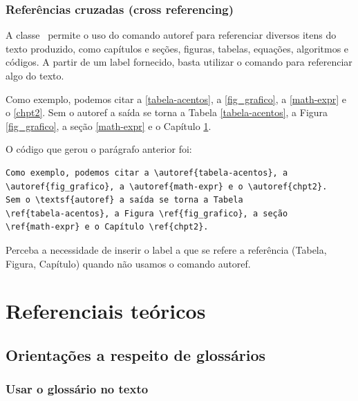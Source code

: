 \section{Referências cruzadas (cross referencing)}

A classe \abnTeX\ permite o uso do comando \textsf{autoref} para referenciar 
diversos itens do texto produzido, como capítulos e seções, figuras, tabelas, 
equações, algoritmos e códigos. A partir de um \textsf{label} fornecido, basta 
utilizar o comando para referenciar algo do texto.

Como exemplo, podemos citar a \autoref{tabela-acentos}, a 
\autoref{fig_grafico}, a \autoref{math-expr} e o \autoref{chpt2}.
Sem o \textsf{autoref} a saída se torna a Tabela 
\ref{tabela-acentos}, a Figura \ref{fig_grafico}, a seção 
\ref{math-expr} e o Capítulo \ref{chpt2}.

O código que gerou o parágrafo anterior foi:
\begin{verbatim}
Como exemplo, podemos citar a \autoref{tabela-acentos}, a 
\autoref{fig_grafico}, a \autoref{math-expr} e o \autoref{chpt2}.
Sem o \textsf{autoref} a saída se torna a Tabela 
\ref{tabela-acentos}, a Figura \ref{fig_grafico}, a seção 
\ref{math-expr} e o Capítulo \ref{chpt2}.
\end{verbatim}

Perceba a necessidade de inserir o label a que se refere a referência
(Tabela, Figura, Capítulo) quando não usamos o comando \textsf{autoref}.



\part{Referenciais teóricos}


\chapter{Orientações a respeito de glossários}
\label{chpt2}
 
\section{Usar o glossário no texto}
 
